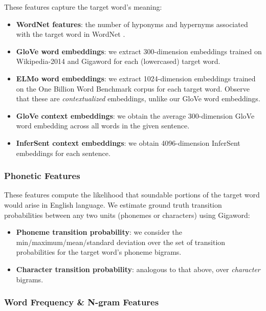 \documentclass{dcthesis}
\theoremstyle{definition}
\theoremstyle{remark}
\begin{document}
\label{paper:semantic_features} These features capture the target word's meaning:

\begin{itemize}
  \item \textbf{WordNet features}: the number of hyponyms and hypernyms associated with the target word in WordNet \citep{fellbaum2010wordnet}.
  \item \textbf{GloVe word embeddings}: we extract 300-dimension embeddings trained on Wikipedia-2014 and Gigaword \citep{pennington2014glove} for each (lowercased) target word. 
  \item \textbf{ELMo word embeddings}: we extract 1024-dimension embeddings trained on the One Billion Word Benchmark corpus \citep{peters2018deep} for each target word. Observe that these are \textit{contextualized} embeddings, unlike our GloVe word embeddings. 
  \item \textbf{GloVe context embeddings}: we obtain the average 300-dimension GloVe word embedding across all words in the given sentence.
  \item \textbf{InferSent context embeddings}: we obtain 4096-dimension InferSent embeddings \citep{conneau2017supervised} for each sentence.
\end{itemize}

\subsubsection{Phonetic Features}

These features compute the likelihood that soundable portions of the target word would arise in English language. We estimate ground truth transition probabilities between any two units (phonemes or characters) using Gigaword:

\begin{itemize}
  \item \textbf{Phoneme transition probability}: we consider the min/maximum/mean/standard deviation over the set of transition probabilities for the target word's phoneme bigrams. 
  \item \textbf{Character transition probability}: analogous to that above, over \textit{character} bigrams.
\end{itemize}

\subsubsection{Word Frequency \& N-gram Features}
\end{document}
